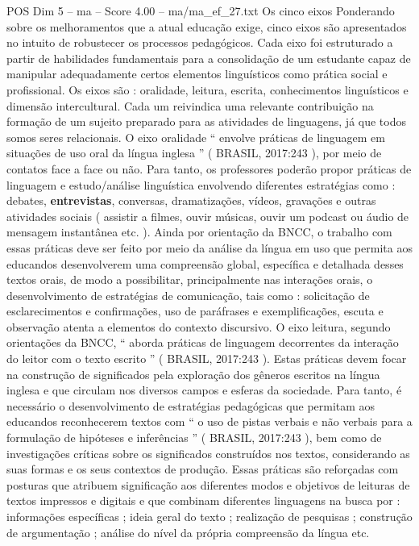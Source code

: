 \begin{textsample}{POS Dim 5 – ma – Score 4.00 – ma/ma\_ef\_27.txt}  \label{ex:f5_pos_180}
Os cinco eixos Ponderando sobre os melhoramentos que a atual educação exige, cinco eixos são apresentados no intuito de robustecer os processos pedagógicos.
Cada eixo foi estruturado a partir de habilidades fundamentais para a consolidação de um estudante capaz de manipular adequadamente certos elementos linguísticos como prática social e profissional.
Os eixos são : oralidade, leitura, escrita, conhecimentos linguísticos e dimensão intercultural.
Cada um reivindica uma relevante contribuição na formação de um sujeito preparado para as atividades de linguagens, já que todos somos seres relacionais.
O eixo oralidade “ envolve práticas de linguagem em situações de uso oral da língua inglesa ” ( BRASIL, 2017:243 ), por meio de contatos face a face ou não.
Para tanto, os professores poderão propor práticas de linguagem e estudo/análise linguística envolvendo diferentes estratégias como : debates, \textbf{entrevistas}, conversas, dramatizações, vídeos, gravações e outras atividades sociais ( assistir a filmes, ouvir músicas, ouvir um podcast ou áudio de mensagem instantânea etc. ).
Ainda por orientação da BNCC, o trabalho com essas práticas deve ser feito por meio da análise da língua em uso que permita aos educandos desenvolverem uma compreensão global, específica e detalhada desses textos orais, de modo a possibilitar, principalmente nas interações orais, o desenvolvimento de estratégias de comunicação, tais como : solicitação de esclarecimentos e confirmações, uso de paráfrases e exemplificações, escuta e observação atenta a elementos do contexto discursivo.
O eixo leitura, segundo orientações da BNCC, “ aborda práticas de linguagem decorrentes da interação do leitor com o texto escrito ” ( BRASIL, 2017:243 ).
Estas práticas devem focar na construção de significados pela exploração dos gêneros escritos na língua inglesa e que circulam nos diversos campos e esferas da sociedade.
Para tanto, é necessário o desenvolvimento de estratégias pedagógicas que permitam aos educandos reconhecerem textos com “ o uso de pistas verbais e não verbais para a formulação de hipóteses e inferências ” ( BRASIL, 2017:243 ), bem como de investigações críticas sobre os significados construídos nos textos, considerando as suas formas e os seus contextos de produção.
Essas práticas são reforçadas com posturas que atribuem significação aos diferentes modos e objetivos de leituras de textos impressos e digitais e que combinam diferentes linguagens na busca por : informações específicas ; ideia geral do texto ; realização de pesquisas ; construção de argumentação ; análise do nível da própria compreensão da língua etc.

\end{textsample}
